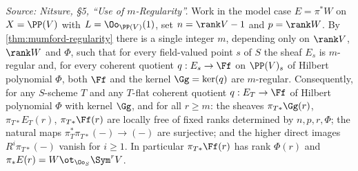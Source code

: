 \begin{lemma}
  \label{lem:quot-uniform-regularity}
  \textit{Source: Nitsure, §5, ``Use of $m$-Regularity''.}
  Work in the model case $E = \pi^* W$ on $X = \PP(V)$ with
  $L = \Oo_{\PP(V)}(1)$, set $n = \rank V - 1$ and $p = \rank W$. By
  \cref{thm:mumford-regularity} there is a single integer $m$, depending only on
  $\rank V$, $\rank W$ and $\Phi$, such that for every field-valued point $s$ of
  $S$ the sheaf $E_s$ is $m$-regular and, for every coherent quotient
  $q : E_s \to \Ff$ on $\PP(V)_s$ of Hilbert polynomial $\Phi$, both $\Ff$ and
  the kernel $\Gg = \ker(q)$ are $m$-regular. Consequently, for any $S$-scheme
  $T$ and any $T$-flat coherent quotient $q : E_T \to \Ff$ of Hilbert
  polynomial $\Phi$ with kernel $\Gg$, and for all $r \ge m$: the sheaves
  $\pi_{T*}\Gg(r)$, $\pi_{T*}E_T(r)$, $\pi_{T*}\Ff(r)$ are locally free of fixed
  ranks determined by $n, p, r, \Phi$; the natural maps
  $\pi_T^*\pi_{T*}(-) \to (-)$ are surjective; and the higher direct images
  $R^i\pi_{T*}(-)$ vanish for $i \ge 1$. In particular $\pi_{T*}\Ff(r)$ has rank
  $\Phi(r)$ and $\pi_*E(r) = W \ot_{\Oo_S} \Sym^r V$.
\end{lemma}

